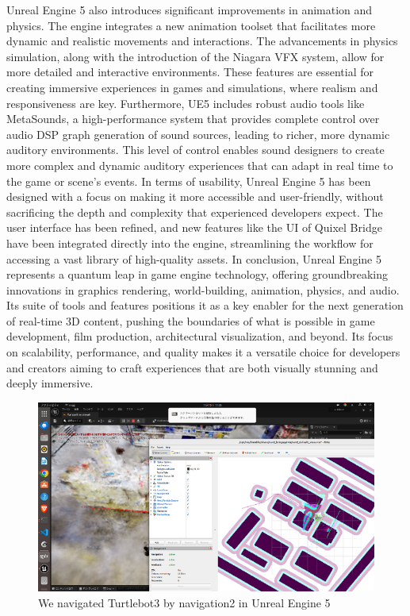 \singlespacing
Unreal Engine 5 also introduces significant improvements in animation and physics. The engine integrates a new animation toolset that facilitates more dynamic and realistic movements and interactions. The advancements in physics simulation, along with the introduction of the Niagara VFX system, allow for more detailed and interactive environments. These features are essential for creating immersive experiences in games and simulations, where realism and responsiveness are key.
\singlespacing
Furthermore, UE5 includes robust audio tools like MetaSounds, a high-performance system that provides complete control over audio DSP graph generation of sound sources, leading to richer, more dynamic auditory environments. This level of control enables sound designers to create more complex and dynamic auditory experiences that can adapt in real time to the game or scene's events.
\singlespacing
In terms of usability, Unreal Engine 5 has been designed with a focus on making it more accessible and user-friendly, without sacrificing the depth and complexity that experienced developers expect. The user interface has been refined, and new features like the UI of Quixel Bridge have been integrated directly into the engine, streamlining the workflow for accessing a vast library of high-quality assets.
\singlespacing
In conclusion, Unreal Engine 5 represents a quantum leap in game engine technology, offering groundbreaking innovations in graphics rendering, world-building, animation, physics, and audio. Its suite of tools and features positions it as a key enabler for the next generation of real-time 3D content, pushing the boundaries of what is possible in game development, film production, architectural visualization, and beyond. Its focus on scalability, performance, and quality makes it a versatile choice for developers and creators aiming to craft experiences that are both visually stunning and deeply immersive.



\begin{figure}[htbp]
  \includegraphics[scale=1.8]{./Figure/画像17.png}
  \caption{We navigated Turtlebot3 by navigation2  in Unreal Engine 5}
  \label{fig:We navigated Turtlebot3 by navigation2  in Unreal Engine 5}
\end{figure}

